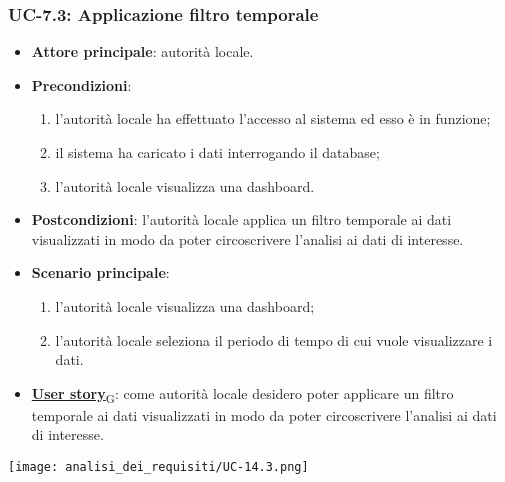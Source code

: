 \subsubsection{UC-7.3: Applicazione filtro temporale}
\begin{itemize}
	\item \textbf{Attore principale}: autorità locale.
	\item \textbf{Precondizioni}:
	      \begin{enumerate}
		      \item l'autorità locale ha effettuato l'accesso al sistema ed esso è in funzione;
		      \item il sistema ha caricato i dati interrogando il database;
		      \item l'autorità locale visualizza una dashboard.
	      \end{enumerate}
	\item \textbf{Postcondizioni}: l'autorità locale applica un filtro temporale ai dati visualizzati in modo da poter circoscrivere l'analisi ai dati di interesse.
	\item \textbf{Scenario principale}:
	      \begin{enumerate}
		      \item l'autorità locale visualizza una dashboard;
		      \item l'autorità locale seleziona il periodo di tempo di cui vuole visualizzare i dati.
	      \end{enumerate}
	\item \href{https://7last.github.io/docs/pb/documentazione-interna/glossario\#user-story}{\textbf{User story}\textsubscript{G}}:
	      come autorità locale desidero poter applicare un filtro temporale ai dati visualizzati in modo da poter circoscrivere l'analisi ai dati di interesse.
\end{itemize}
\begin{center}
	\texttt{[image: analisi\_dei\_requisiti/UC-14.3.png]}
\end{center}

